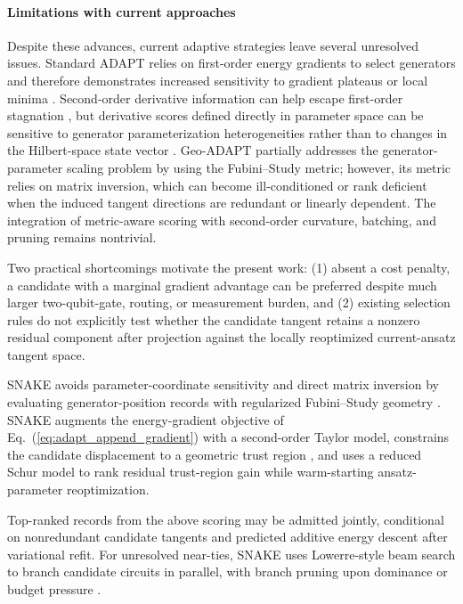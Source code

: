 \documentclass[
  reprint,
  amsmath,
  amssymb,
  aps,
  pra,
  nofootinbib,
  superscriptaddress,
  floatfix
]{revtex4-2}
\begin{document}
\paragraph*{Limitations with current approaches}
Despite these advances, current adaptive strategies leave several unresolved issues. Standard ADAPT relies on first-order energy gradients to select generators \cite{Grimsley2019,Tang2021,Yordanov2021} and therefore demonstrates increased sensitivity to gradient plateaus or local minima \cite{Feniou2023,Grimsley2023ADAPT}.
Second-order derivative information can help escape first-order stagnation \cite{Ramoa2025HessianRecycling}, but derivative scores defined directly in parameter space can be sensitive to generator parameterization heterogeneities rather than to changes in the Hilbert-space state vector \cite{ProvostVallee1980,Stokes2020QNG}. Geo-ADAPT partially addresses the generator-parameter scaling problem by using the Fubini--Study metric; however, its metric relies on matrix inversion, which can become ill-conditioned or rank deficient when the induced tangent directions are redundant or linearly dependent\cite{Sohail2026GeoADAPT}. The integration of metric-aware scoring with second-order curvature, batching, and pruning remains nontrivial.

Two practical shortcomings motivate the present work: (1) absent a cost penalty, a candidate with a marginal gradient advantage can be preferred despite much larger two-qubit-gate, routing, or measurement burden, and (2) existing selection rules do not explicitly test whether the candidate tangent retains a nonzero residual component after projection against the locally reoptimized current-ansatz tangent space.


SNAKE avoids parameter-coordinate sensitivity and direct matrix inversion by evaluating generator-position records with regularized Fubini--Study geometry \cite{Sohail2026GeoADAPT}. SNAKE augments the energy-gradient objective of Eq.~(\ref{eq:adapt_append_gradient}) with a second-order Taylor model, constrains the candidate displacement to a geometric trust region \cite{Nocedal2006TrustRegion}, and uses a reduced Schur model to rank residual trust-region gain while warm-starting ansatz-parameter reoptimization.

Top-ranked records from the above scoring may be admitted jointly, conditional on nonredundant candidate tangents and predicted additive energy descent after variational refit. For unresolved near-ties, SNAKE uses Lowerre-style beam search to branch candidate circuits in parallel, with branch pruning upon dominance or budget pressure \cite{Lowerre1976Beam}.
\end{document}
